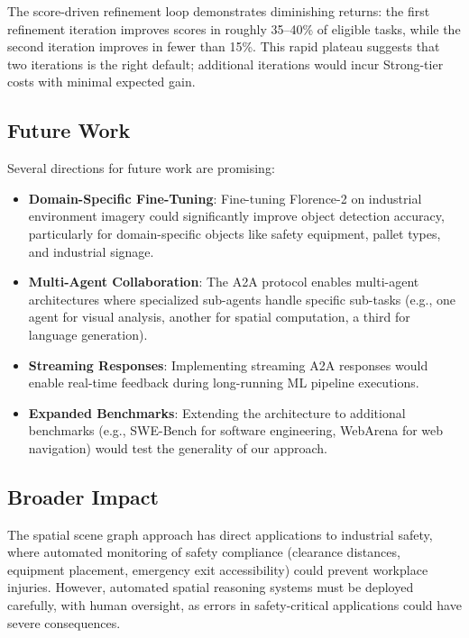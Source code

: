 \documentclass[11pt]{article}
\begin{document}
The score-driven refinement loop demonstrates diminishing returns: the first refinement iteration improves scores in roughly 35--40\% of eligible tasks, while the second iteration improves in fewer than 15\%. This rapid plateau suggests that two iterations is the right default; additional iterations would incur Strong-tier costs with minimal expected gain.

\subsection{Future Work}

Several directions for future work are promising:

\begin{itemize}[leftmargin=*,itemsep=2pt]
  \item \textbf{Domain-Specific Fine-Tuning}: Fine-tuning Florence-2 on industrial environment imagery could significantly improve object detection accuracy, particularly for domain-specific objects like safety equipment, pallet types, and industrial signage.
  \item \textbf{Multi-Agent Collaboration}: The A2A protocol enables multi-agent architectures where specialized sub-agents handle specific sub-tasks (e.g., one agent for visual analysis, another for spatial computation, a third for language generation).
  \item \textbf{Streaming Responses}: Implementing streaming A2A responses would enable real-time feedback during long-running ML pipeline executions.
  \item \textbf{Expanded Benchmarks}: Extending the architecture to additional benchmarks (e.g., SWE-Bench for software engineering, WebArena for web navigation) would test the generality of our approach.
\end{itemize}

\subsection{Broader Impact}

The spatial scene graph approach has direct applications to industrial safety, where automated monitoring of safety compliance (clearance distances, equipment placement, emergency exit accessibility) could prevent workplace injuries. However, automated spatial reasoning systems must be deployed carefully, with human oversight, as errors in safety-critical applications could have severe consequences.

\end{document}
